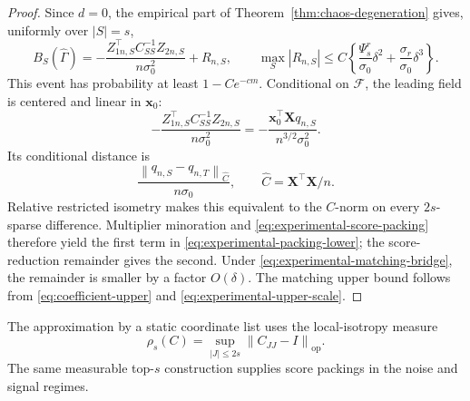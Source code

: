 \documentclass[a4paper,11pt,english]{article}
\newcommand{\norm}[1]{\left\lVert #1\right\rVert}
\begin{document}
\begin{proof}
Since $d=0$, the empirical part of
Theorem~\ref{thm:chaos-degeneration} gives, uniformly over $|S|=s$,
\begin{equation*}
        B_S(\hat\Gamma)
        =-\frac{Z_{1n,S}^\top C_{SS}^{-1}Z_{2n,S}}
        {n\sigma_0^2}+R_{n,S},
        \qquad
        \max_S|R_{n,S}|
        \le C\left\{
        \frac{\Psi_s^r}{\sigma_0}\delta^2
        +\frac{\sigma_r}{\sigma_0}\delta^3\right\}.
\end{equation*}
This event has probability at least $1-Ce^{-cm}$.  Conditional on
$\mathcal F$, the leading field is centered and linear in $\mathbf x_0$:
\begin{equation*}
        -\frac{Z_{1n,S}^\top C_{SS}^{-1}Z_{2n,S}}
        {n\sigma_0^2}
        =-\frac{\mathbf x_0^\top\mathbf Xq_{n,S}}
        {n^{3/2}\sigma_0^2}.
\end{equation*}
Its conditional distance is
\[
        \frac{\norm{q_{n,S}-q_{n,T}}_{\hat C}}{n\sigma_0},
        \qquad \hat C=\mathbf X^\top\mathbf X/n.
\]
Relative restricted isometry makes this equivalent to the $C$-norm
on every $2s$-sparse difference.  Multiplier minoration and
\eqref{eq:experimental-score-packing} therefore yield the first term in
\eqref{eq:experimental-packing-lower}; the score-reduction remainder
gives the second.  Under \eqref{eq:experimental-matching-bridge}, the
remainder is smaller by a factor $O(\delta)$.  The matching upper bound
follows from \eqref{eq:coefficient-upper} and
\eqref{eq:experimental-upper-scale}.
\end{proof}

The approximation by a static coordinate list uses the local-isotropy
measure
\begin{equation}\label{eq:local-isotropy}
        \rho_s(C)=\sup_{|J|\le2s}\norm{C_{JJ}-I}_{\mathrm{op}}.
\end{equation}
The same measurable top-$s$ construction supplies score packings in the
noise and signal regimes.
\end{document}
